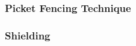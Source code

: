 \documentclass[12pt,openany,a4paper]{book}
\begin{document}
\subsubsection{Picket Fencing Technique}	\label{sec:picket}


\subsubsection{Shielding}









%
% 
%
%
%
%
%
%
%
%
%
% 






\end{document}
